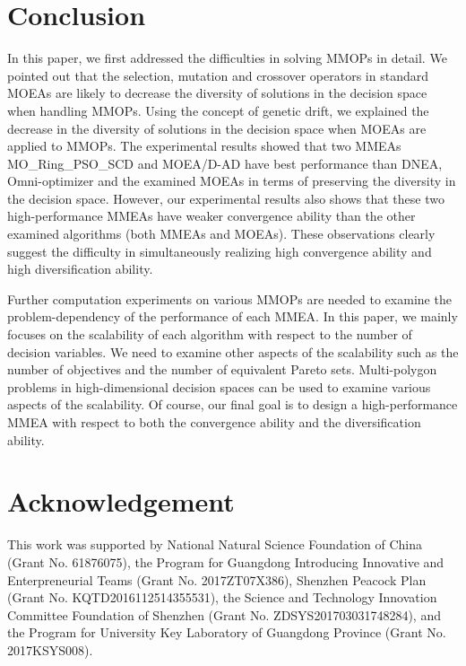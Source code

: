 \documentclass[conference]{IEEEtran}
\begin{document}
\section{Conclusion}
\label{Conclusion}
In this paper, we first addressed the difficulties in solving MMOPs in detail. We pointed out that the selection, mutation and crossover operators in standard MOEAs are likely to decrease the diversity of solutions in the decision space when handling MMOPs. Using the concept of genetic drift, we explained the decrease in the diversity of solutions in the decision space when MOEAs are applied to MMOPs. The experimental results showed that two MMEAs MO\_Ring\_PSO\_SCD and MOEA/D-AD have best performance than DNEA, Omni-optimizer and the examined MOEAs in terms of preserving the diversity in the decision space. However, our experimental results also shows that these two high-performance MMEAs have weaker convergence ability than the other examined algorithms (both MMEAs and MOEAs). These observations clearly suggest the difficulty in simultaneously realizing high convergence ability and high diversification ability.

Further computation experiments on various MMOPs are needed to examine the problem-dependency of the performance of each MMEA. In this paper, we mainly focuses on the scalability of each algorithm with respect to the number of decision variables. We need to examine other aspects of the scalability such as the number of objectives and the number of equivalent Pareto sets. Multi-polygon problems in high-dimensional decision spaces can be used to examine various aspects of the scalability. Of course, our final goal is to design a high-performance MMEA with respect to both the convergence ability and the diversification ability.
\section*{Acknowledgement}
This work was supported by National Natural Science Foundation of China (Grant No. 61876075), the Program for Guangdong Introducing Innovative and Enterpreneurial Teams (Grant No. 2017ZT07X386), Shenzhen Peacock Plan (Grant No. KQTD2016112514355531), the Science and Technology Innovation Committee Foundation of Shenzhen (Grant No. ZDSYS201703031748284), and the Program for University Key Laboratory of Guangdong Province (Grant No. 2017KSYS008).


\end{document}
